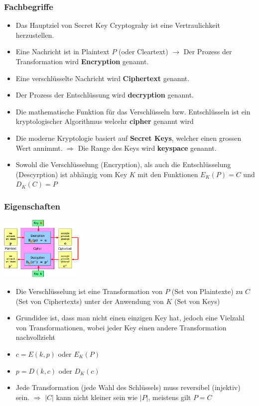 \documentclass{report}
\newenvironment{Figure}
	{\par\medskip\noindent\minipage{\linewidth}}
	{\endminipage\par\medskip}
\theoremstyle{definition}
\theoremstyle{example}
\begin{document}
		\subsubsection{Fachbegriffe}
\begin{itemize}
	\item Das Hauptziel von Secret Key Cryptograhy ist eine Vertraulichkeit herzustellen.
	\item Eine Nachricht ist in Plaintext $P$ (oder Cleartext) $\rightarrow$ Der Prozess der Transformation wird \textbf{Encryption} genannt.
	\item Eine verschlüsselte Nachricht wird \textbf{Ciphertext} genannt.
	\item Der Prozess der Entschlüssung wird \textbf{decryption} genannt.
	\item Die mathematische Funktion für das Verschlüsseln bzw. Entschlüsseln ist ein kryptologischer Algorithmus welcehr \textbf{cipher} genannt wird
	\item Die moderne Kryptologie basiert auf \textbf{Secret Keys}, welcher einen grossen Wert annimmt. $\Rightarrow$ Die Range des Keys wird \textbf{keyspace} genannt.
	\item Sowohl die Verschlüsselung (Encryption), als auch die Entschlüsselung (Descyrption) ist abhängig vom Key $K$ mit den Funktionen $E_K(P) = C$ und $D_K(C) = P$
\end{itemize}

		\subsubsection{Eigenschaften}
\begin{Figure}
\centering
\includegraphics[width=150px]{img/BasicTerminologySecKeyCrypto.png}
	\label{fig:Basic Terminology}
\end{Figure}
\begin{itemize}
	\item Die Verschlüsselung ist eine Transformation von $P$ (Set von Plaintexte) zu $C$ (Set von Ciphertexts) unter der Anwendung von $K$ (Set von Keys)
	\item Grundidee ist, dass man nicht einen einzigen Key hat, jedoch eine Vielzahl von Transformationen, wobei jeder Key einen andere Transformation nachvollzieht
	\item $c = E(k,p)$ oder $E_K(P)$
	\item $p = D(k,c)$ oder $D_K(c)$
	\item Jede Transformation (jede Wahl des Schlüssels) muss reversibel (injektiv) sein. $\Rightarrow$ $|C|$ kann nicht kleiner sein wie $|P|$, meistens gilt $P = C$
\end{itemize}
\end{document}
